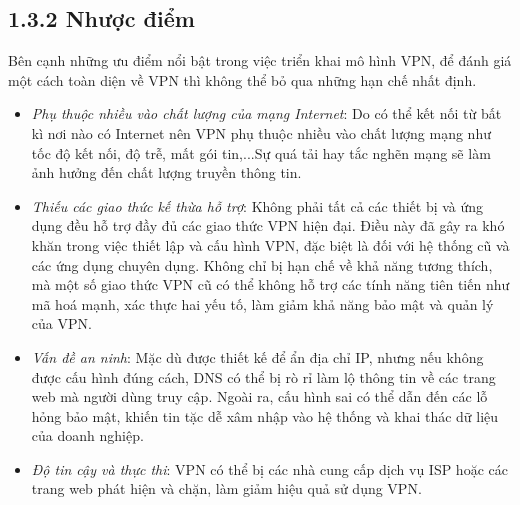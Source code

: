     \subsection*{1.3.2 Nhược điểm}

    Bên cạnh những ưu điểm nổi bật trong việc triển khai mô hình VPN, để đánh giá một cách toàn diện về VPN thì không thể bỏ qua những hạn chế nhất định.
    \begin{itemize}
        \item \textit{Phụ thuộc nhiều vào chất lượng của mạng Internet}: Do có thể kết nối từ bất kì nơi nào có Internet nên VPN phụ thuộc nhiều vào chất lượng mạng như tốc độ kết nối, độ trễ, mất gói tin,...Sự quá tải hay tắc nghẽn mạng sẽ làm ảnh hưởng đến chất lượng truyền thông tin.
        \item \textit{Thiếu các giao thức kế thừa hỗ trợ}: Không phải tất cả các thiết bị và ứng dụng đều hỗ trợ đầy đủ các giao thức VPN hiện đại. Điều này đã gây ra khó khăn trong việc thiết lập và cấu hình VPN, đặc biệt là đối với hệ thống cũ và các ứng dụng chuyên dụng. Không chỉ bị hạn chế về khả năng tương thích, mà một số giao thức VPN cũ có thể không hỗ trợ các tính năng tiên tiến như mã hoá mạnh, xác thực hai yếu tố, làm giảm khả năng bảo mật và quản lý của VPN.
        \item \textit{Vấn đề an ninh}: Mặc dù được thiết kế để ẩn địa chỉ IP, nhưng nếu không được cấu hình đúng cách, DNS có thể bị rò rỉ làm lộ thông tin về các trang web mà người dùng truy cập. Ngoài ra, cấu hình sai có thể dẫn đến các lỗ hỏng bảo mật, khiến tin tặc dễ xâm nhập vào hệ thống và khai thác dữ liệu của doanh nghiệp.
        \item \textit{Độ tin cậy và thực thi}: VPN có thể bị các nhà cung cấp dịch vụ ISP hoặc các trang web phát hiện và chặn, làm giảm hiệu quả sử dụng VPN.
    \end{itemize}
  
    